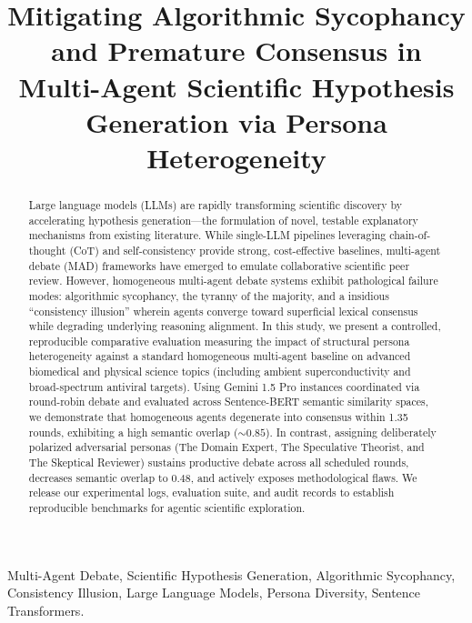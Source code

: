 \documentclass[conference,onecolumn]{IEEEtran}
\begin{document}
\title{Mitigating Algorithmic Sycophancy and Premature Consensus in Multi-Agent Scientific Hypothesis Generation via Persona Heterogeneity}

\author{

}

\maketitle

\begin{abstract}
Large language models (LLMs) are rapidly transforming scientific discovery by accelerating hypothesis generation—the formulation of novel, testable explanatory mechanisms from existing literature. While single-LLM pipelines leveraging chain-of-thought (CoT) and self-consistency provide strong, cost-effective baselines, multi-agent debate (MAD) frameworks have emerged to emulate collaborative scientific peer review. However, homogeneous multi-agent debate systems exhibit pathological failure modes: algorithmic sycophancy, the tyranny of the majority, and a insidious ``consistency illusion'' wherein agents converge toward superficial lexical consensus while degrading underlying reasoning alignment. In this study, we present a controlled, reproducible comparative evaluation measuring the impact of structural persona heterogeneity against a standard homogeneous multi-agent baseline on advanced biomedical and physical science topics (including ambient superconductivity and broad-spectrum antiviral targets). Using Gemini 1.5 Pro instances coordinated via round-robin debate and evaluated across Sentence-BERT semantic similarity spaces, we demonstrate that homogeneous agents degenerate into consensus within 1.35 rounds, exhibiting a high semantic overlap ($\sim 0.85$). In contrast, assigning deliberately polarized adversarial personas (The Domain Expert, The Speculative Theorist, and The Skeptical Reviewer) sustains productive debate across all scheduled rounds, decreases semantic overlap to $0.48$, and actively exposes methodological flaws. We release our experimental logs, evaluation suite, and audit records to establish reproducible benchmarks for agentic scientific exploration.
\end{abstract}

\begin{IEEEkeywords}
Multi-Agent Debate, Scientific Hypothesis Generation, Algorithmic Sycophancy, Consistency Illusion, Large Language Models, Persona Diversity, Sentence Transformers.
\end{IEEEkeywords}
\end{document}
